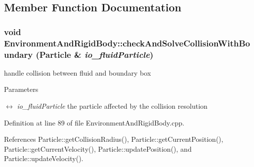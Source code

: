 \subsection{Member Function Documentation}
\hypertarget{class_environment_and_rigid_body_ad2f2263fff1ed7f94bb920b7970bdfa3}{
\subsubsection[{checkAndSolveCollisionWithBoundary}]{\setlength{\rightskip}{0pt plus 5cm}void EnvironmentAndRigidBody::checkAndSolveCollisionWithBoundary ({\bf Particle} \& {\em io\_\-fluidParticle})}}
\label{class_environment_and_rigid_body_ad2f2263fff1ed7f94bb920b7970bdfa3}


handle collision between fluid and boundary box 


\begin{DoxyParams}{Parameters}
\item[\mbox{$\leftrightarrow$} {\em io\_\-fluidParticle}]the particle affected by the collision resolution \end{DoxyParams}


Definition at line 89 of file EnvironmentAndRigidBody.cpp.



References Particle::getCollisionRadius(), Particle::getCurrentPosition(), Particle::getCurrentVelocity(), Particle::updatePosition(), and Particle::updateVelocity().




